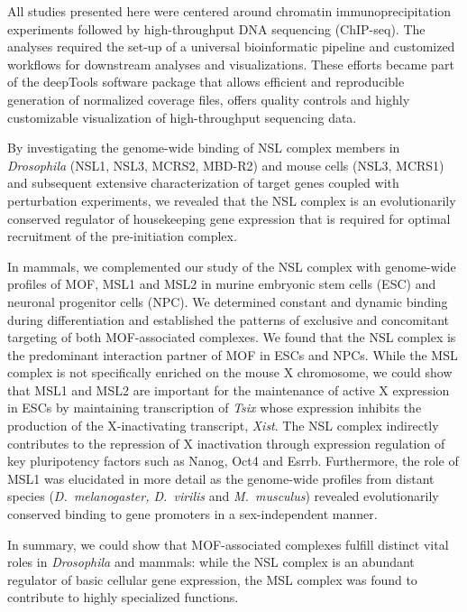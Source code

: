 All studies presented here were centered around chromatin immunoprecipitation experiments followed by high-throughput DNA sequencing (ChIP-seq). The analyses required the set-up of a universal bioinformatic pipeline and customized workflows for downstream analyses and visualizations. These efforts became part of the deepTools software package that allows efficient and reproducible generation of normalized coverage files, offers quality controls and highly customizable visualization of high-throughput sequencing data.

By investigating the genome-wide binding of NSL complex members in \textit{Drosophila} (NSL1, NSL3, MCRS2, MBD-R2) and mouse cells (NSL3, MCRS1) and subsequent extensive characterization of target genes coupled with perturbation experiments, we revealed that the NSL complex is an evolutionarily conserved regulator of housekeeping gene expression that is required for optimal recruitment of the pre-initiation complex. 

In mammals, we complemented our study of the NSL complex with genome-wide profiles of MOF, MSL1 and MSL2 in murine embryonic stem cells (ESC) and neuronal progenitor cells (NPC). We determined constant and dynamic binding during differentiation and established the patterns of exclusive and concomitant targeting of both MOF-associated complexes. We found that the NSL complex is the predominant interaction partner of MOF in ESCs and NPCs. While the MSL complex is not specifically enriched on the mouse X chromosome, we could show that MSL1 and MSL2 are important for the maintenance of active X expression in ESCs by maintaining transcription of \textit{Tsix} whose expression inhibits the production of the X-inactivating transcript, \textit{Xist}. The NSL complex indirectly contributes to the repression of X inactivation through expression regulation of key pluripotency factors such as Nanog, Oct4 and Esrrb. Furthermore, the role of MSL1 was elucidated in more detail as the genome-wide profiles from distant species (\textit{D.~melanogaster, D.~virilis} and \textit{M.~musculus}) revealed evolutionarily conserved binding to gene promoters in a sex-independent manner. 

In summary, we could show that MOF-associated complexes fulfill distinct vital roles in \textit{Drosophila} and mammals: while the NSL complex is an abundant regulator of basic cellular gene expression, the MSL complex was found to contribute to highly specialized functions.


